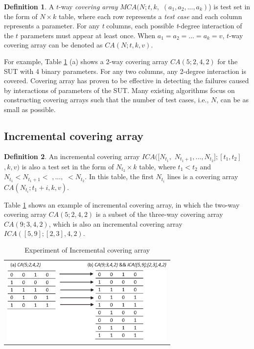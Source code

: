 \documentclass[conference]{IEEEtran}
\theoremstyle{definition}
\newtheorem{definition}{Definition}
\begin{document}
\begin{definition}A $t$-way \emph{covering array} $MCA(N; t, k,$ $(a_{1}, a_{2}, ..., a_{k})$) is test set in the form of $N \times k$ table, where each row represents a \emph{test case} and each column represents a parameter.  For any \emph{t} columns, each possible \emph{t}-degree interaction of the $t$ parameters must appear at least once. When $ a_{1} = a_{2} = ... = a_{k} = v $, $t$-way covering array can be denoted as $CA(N; t, k, v)$.
\end{definition}


For example, Table \ref{ica_example} (a) shows a 2-way covering array $CA(5;2,4,2)$ for the SUT with 4 binary parameters. For any two columns, any 2-degree interaction is covered.  Covering array has proven to be effective in detecting the failures caused by interactions of parameters of the SUT. Many existing algorithms focus on constructing covering arrays such that the number of test cases, i.e., $N$, can be as small as possible.


\subsection{Incremental covering array}

\begin{definition}
An incremental covering array $ICA([N_{t_{1}},$ $N_{t_{1} + 1},...,N_{t_{2}}];[t_{1},t_{2}]$ $, k, v)$ is also a test set in the form of $N_{t_{2}} \times k$ table, where $t_{1} < t_{2}$ and  $N_{t_{1}}<N_{t_{1} + 1} <$ $,...,$ $< N_{t_{2}}$.  In this table, the first $N_{t_{i}}$ lines is a covering array $CA(N_{t_{i}}; t_{1} + i, k , v)$.
\end{definition}


Table \ref{ica_example} shows an example of incremental covering array, in which the two-way covering array $CA(5;2,4,2)$ is a subset of the three-way covering array $CA(9;3,4,2)$, which is also an incremental covering array $ICA([5,9];[2,3],4,2)$.

\begin{table}[htbp]
  \small
  \centering
  \caption{Experiment of Incremental covering array}
  \label{ica_example}

    \begin{tabular}{c}
 \includegraphics[width=3.4in]{incremental_covering_ex.eps}
    \end{tabular}%

\end{table}
\end{document}

